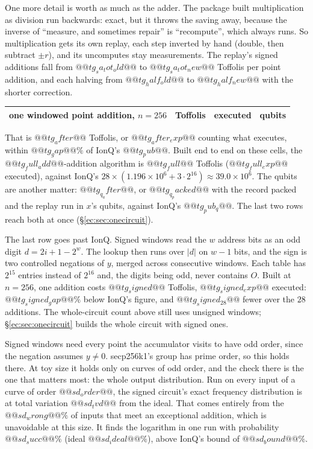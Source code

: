 One more detail is worth as much as the adder. The package built multiplication as division run
backwards: exact, but it throws the saving away, because the inverse of ``measure, and sometimes
repair'' is ``recompute'', which always runs. So multiplication gets its own replay, each step
inverted by hand (double, then subtract $\pm r$), and its uncomputes stay measurements. The replay's
signed additions fall from $@@tg_sa_tot_old@@$ to $@@tg_sa_tot_new@@$ Toffolis per point addition,
and each halving from $@@tg_half_old@@$ to $@@tg_half_new@@$ with the shorter correction.

\begin{center}\small
\begin{tabular}{lrrr}
\toprule
one windowed point addition, $n=256$ & Toffolis & executed & qubits\\
\midrule
\bottomrule
\end{tabular}
\end{center}

That is $@@tg_after@@$ Toffolis, or $@@tg_after_exp@@$ counting what executes, within $@@tg_gap@@\%$ of
IonQ's $@@tg_pub@@$. Built end to end on these cells, the $@@tg_full_add@@$-addition algorithm is
$@@tg_full@@$ Toffolis ($@@tg_full_exp@@$ executed), against IonQ's
$28\times(1.196\times10^6+3\cdot2^{16})\approx39.0\times10^6$. The qubits are another matter:
$@@tg_q_after@@$, or $@@tg_q_packed@@$ with the record packed and the replay run in $x$'s qubits,
against IonQ's $@@tg_pub_q@@$. The last two rows reach both at once (\S\ref{ec:sec:onecircuit}).

The last row goes past IonQ. Signed windows \cite{ec:hjnrs20,ec:kim26} read the $w$ address bits as
an odd digit $d=2i+1-2^w$. The lookup then runs over $|d|$ on $w-1$ bits, and the sign is two
controlled negations of $y$, merged across consecutive windows. Each table has $2^{15}$ entries
instead of $2^{16}$ and, the digits being odd, never contains $O$. Built at $n=256$, one addition
costs $@@tg_signed@@$ Toffolis, $@@tg_signed_exp@@$ executed: $@@tg_signed_gap@@\%$ below IonQ's
figure, and $@@tg_signed_28@@$ fewer over the $28$ additions. The whole-circuit count above still
uses unsigned windows; \S\ref{ec:sec:onecircuit} builds the whole circuit with signed ones.

Signed windows need every point the accumulator visits to have odd order, since the negation
assumes $y\neq0$. secp256k1's group has prime order, so this holds there. At toy size it holds only
on curves of odd order, and the check there is the one that matters most: the whole output
distribution. Run on every input of a curve of order $@@sd_order@@$, the signed circuit's exact
frequency distribution is at total variation $@@sd_tvd@@$ from the ideal. That comes entirely from
the $@@sd_wrong@@\%$ of inputs that meet an exceptional addition, which is unavoidable at this size.
It finds the logarithm in one run with probability $@@sd_succ@@\%$ (ideal $@@sd_ideal@@\%$), above
IonQ's bound of $@@sd_bound@@\%$.

